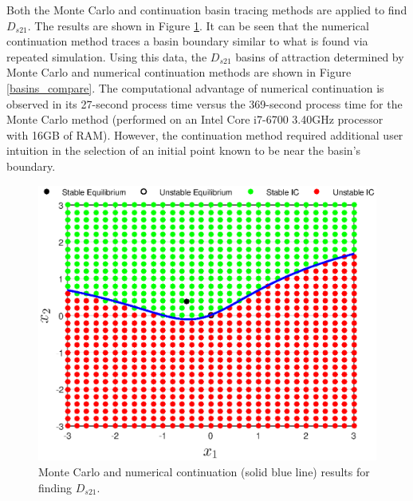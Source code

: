 \documentclass[12pt]{article}
\begin{document}
Both the Monte Carlo and continuation basin tracing methods are applied to find $D_{s21}$. The results are shown in Figure \ref{basin_compare}. It can be seen that the numerical continuation method traces a basin boundary similar to what is found via repeated simulation. Using this data, the $D_{s21}$ basins of attraction determined by Monte Carlo and numerical continuation methods are shown in Figure \ref{basins_compare}. The computational advantage of numerical continuation is observed in its 27-second process time versus the 369-second process time for the Monte Carlo method (performed on an Intel Core i7-6700 3.40GHz processor with 16GB of RAM). However, the continuation method required additional user intuition in the selection of an initial point known to be near the basin's boundary. 

\begin{figure}[H]
\begin{center}
\includegraphics[width=4.5in]{basin_compare.eps}
\caption{Monte Carlo and numerical continuation (solid blue line) results for finding $D_{s21}$.}
\label{basin_compare}
\end{center}
\end{figure} 
\end{document}
